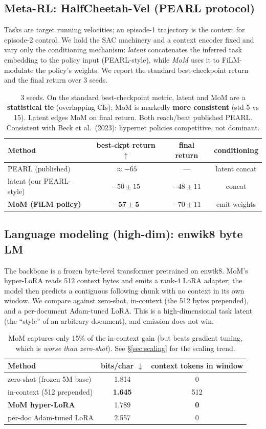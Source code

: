 \documentclass[11pt]{article}
\begin{document}
\subsection{Meta-RL: HalfCheetah-Vel (PEARL protocol)}
Tasks are target running velocities; an episode-1 trajectory is the context for
episode-2 control. We hold the SAC machinery and a context encoder fixed and vary
only the conditioning mechanism: \emph{latent} concatenates the inferred task
embedding to the policy input (PEARL-style), while \emph{MoM} uses it to FiLM-modulate
the policy's weights. We report the standard best-checkpoint return and the final
return over 3 seeds.
\begin{table}[h]\centering\small
\begin{tabular}{lccc}
\toprule
Method & best-ckpt return $\uparrow$ & final return & conditioning \\
\midrule
PEARL (published) & $\approx-65$ & --- & latent concat \\
latent (our PEARL-style) & $-50\pm15$ & $-48\pm11$ & concat \\
\textbf{MoM (FiLM policy)} & $\mathbf{-57\pm5}$ & $-70\pm11$ & emit weights \\
\bottomrule
\end{tabular}
\caption{3 seeds. On the standard best-checkpoint metric, latent and MoM are a
\textbf{statistical tie} (overlapping CIs); MoM is markedly \textbf{more consistent}
(std 5 vs 15). Latent edges MoM on final return. Both reach/beat published PEARL.
Consistent with Beck et al.\ (2023): hypernet policies competitive, not dominant.}
\end{table}

\subsection{Language modeling (high-dim): enwik8 byte LM}
The backbone is a frozen byte-level transformer pretrained on enwik8. MoM's
hyper-LoRA reads 512 context bytes and emits a rank-4 LoRA adapter; the model then
predicts a contiguous following chunk with no context in its own window. We compare
against zero-shot, in-context (the 512 bytes prepended), and a per-document
Adam-tuned LoRA. This is a high-dimensional task latent (the ``style'' of an
arbitrary document), and emission does not win.
\begin{table}[h]\centering\small
\begin{tabular}{lcc}
\toprule
Method & bits/char $\downarrow$ & context tokens in window \\
\midrule
zero-shot (frozen 5M base) & 1.814 & 0 \\
in-context (512 prepended) & \textbf{1.645} & 512 \\
\textbf{MoM hyper-LoRA} & 1.789 & \textbf{0} \\
per-doc Adam-tuned LoRA & 2.557 & 0 \\
\bottomrule
\end{tabular}
\caption{MoM captures only 15\% of the in-context gain (but beats gradient tuning,
which is \emph{worse than zero-shot}). See \S\ref{sec:scaling} for the scaling trend.}
\end{table}
\end{document}

